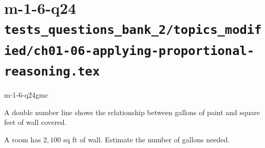 \documentclass[12pt, fleqn, openany]{studyGuide}
\begin{document}
\section*{m-1-6-q24 \hfill \normalsize\texttt{tests\_questions\_bank\_2/topics\_modified/ch01-06-applying-proportional-reasoning.tex}}
\begin{practiceQuestion}{m-1-6-q24}{gmc}
\begin{questionText}
A double number line shows the relationship between gallons of paint and square feet of wall covered.

\begin{center}
\end{center}

A room has $2{,}100$ sq ft of wall. Estimate the number of gallons needed.
\end{questionText}
\end{practiceQuestion}

\newpage
\end{document}
